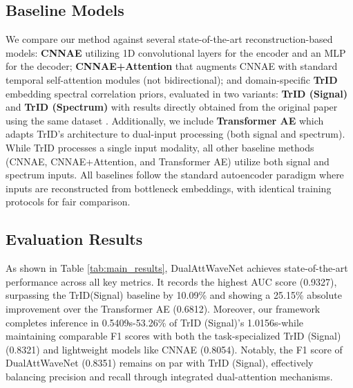 \documentclass[conference]{IEEEtran}
\begin{document}
\subsection{Baseline Models}

We compare our method against several state-of-the-art reconstruction-based models: \textbf{CNNAE} utilizing 1D convolutional layers for the encoder and an MLP for the decoder; \textbf{CNNAE+Attention} that augments CNNAE with standard temporal self-attention modules (not bidirectional); and domain-specific \textbf{TrID}  embedding spectral correlation priors, evaluated in two variants: \textbf{TrID (Signal)} and \textbf{TrID (Spectrum)} with results directly obtained from the original paper using the same dataset \cite{saifaldawlaGenAIBasedModelsNGSO2024}. Additionally, we include \textbf{Transformer AE} which adapts TrID's architecture to dual-input processing (both signal and spectrum). While TrID processes a single input modality, all other baseline methods (CNNAE, CNNAE+Attention, and Transformer AE) utilize both signal and spectrum inputs. All baselines follow the standard autoencoder paradigm where inputs are reconstructed from bottleneck embeddings, with identical training protocols for fair comparison.

\subsection{Evaluation Results}

As shown in Table \ref{tab:main_results}, DualAttWaveNet achieves state-of-the-art performance across all key metrics. It records the highest AUC score (0.9327), surpassing the TrID(Signal) baseline by 10.09\% and showing a 25.15\% absolute improvement over the Transformer AE (0.6812). Moreover, our framework completes inference in 0.5409s-53.26\% of TrID (Signal)'s 1.0156s-while maintaining comparable F1 scores with both the task-specialized TrID (Signal) (0.8321) and lightweight models like CNNAE (0.8054). Notably, the F1 score of DualAttWaveNet (0.8351) remains on par with TrID (Signal), effectively balancing precision and recall through integrated dual-attention mechanisms.
\end{document}
